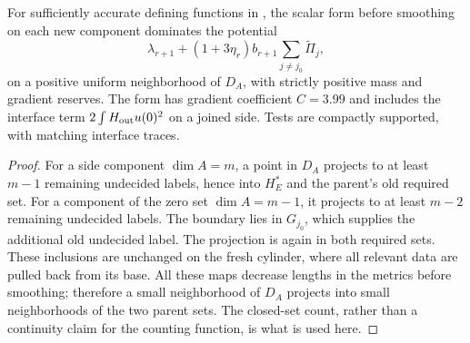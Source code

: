 \begin{lemma}\label{regular:transfer}
For sufficiently accurate defining functions in
, the scalar form before smoothing on each new component
dominates the potential
\begin{equation}\label{regular:raw-target}
 \lambda_{r+1}+(1+3\eta_r)b_{r+1}\sum_{j\ne j_0}\widetilde\Pi_j,
\end{equation}
on a positive uniform neighborhood of $D_A$, with strictly positive
mass and gradient reserves.  The form has
gradient coefficient $C=3.99$ and includes the interface term
$2\int H_{\rm out}u(0)^2$ on a joined side.  Tests are compactly
supported, with matching interface traces.
\end{lemma}

\begin{proof}
For a side component $\dim A=m$, a point in $D_A$ projects to at least
$m-1$ remaining undecided labels, hence into $H_E^*$ and the parent's
old required set.  For a component of the zero set $\dim A=m-1$, it projects to at
least $m-2$ remaining undecided labels.  The boundary lies in $G_{j_0}$,
which supplies the additional old undecided label.  The projection is
again in both required sets.  These inclusions are unchanged on the
fresh cylinder, where all relevant data are pulled back from its base.
All these maps decrease lengths in the metrics before smoothing; therefore a small
neighborhood of $D_A$ projects into small neighborhoods of the two
parent sets.  The closed-set count, rather than a continuity claim for
the counting function, is what is used here.


\end{proof}
